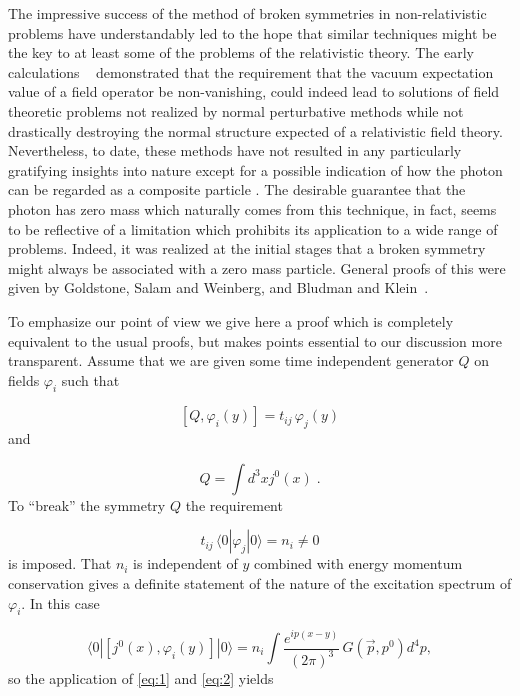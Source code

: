 \documentclass[%
  12pt,
  paper=letter,
  abstracton,
  pagesize=auto,
  version=last,
  DIV=calc
  ]{article}
\begin{document}
The impressive success of the method of broken symmetries in
non-relativistic problems have understandably led to the hope that
similar techniques might be the key to at least some of the problems
of the relativistic theory.  The early calculations \cite{1}~\cite {2}
demonstrated that the requirement that the vacuum expectation value of
a field operator be non-vanishing, could indeed lead to solutions of
field theoretic problems not realized by normal perturbative methods
while not drastically destroying the normal structure expected of a
relativistic field theory.  Nevertheless, to date, these methods have
not resulted in any particularly gratifying insights into nature
except for a possible indication of how the photon can be regarded as
a composite particle \cite{3}.  The desirable guarantee that the
photon has zero mass which naturally comes from this technique, in
fact, seems to be reflective of a limitation which prohibits its
application to a wide range of problems.  Indeed, it was realized at
the initial stages that a broken symmetry might always be associated
with a zero mass particle.  General proofs of this were given by
Goldstone, Salam and Weinberg, and Bludman and Klein~\cite{4}.

To emphasize our point of view we give here a proof which is
completely equivalent to the usual proofs, but makes points essential to
our discussion more transparent.  Assume that we are given some time
independent generator $Q$ on fields $\varphi_i$ such that

\begin{equation}
\label{eq:1}
\left[Q, \varphi_{i}(y)\right] = t_{ij}\, \varphi_{j}(y)
\end{equation}
and

\begin{equation}
  \label{eq:2}
  Q = \int d^{3}x j^{0}(x) \; .
\end{equation}
To ``break'' the symmetry $Q$ the requirement

\begin{equation*}
t_{ij} \, \langle 0|\varphi_{j}|0\rangle = n_{i} \neq 0
\end{equation*}
is imposed. That $n_i$ is independent of $y$ combined with
energy momentum conservation gives a definite statement of the nature
of the excitation spectrum of $\varphi_i$. In this case

\begin{equation*}
  \langle 0| \left[j^{0}(x), \varphi_{i}(y)\right] |0\rangle =
    n_{i}\int \frac{e^{ip(x-y)}}{(2\pi)^3}\, G(\vec{p}, p^{0}) d^{4}p,
\end{equation*}
so the application of \eqref{eq:1} and \eqref{eq:2} yields
\end{document}
